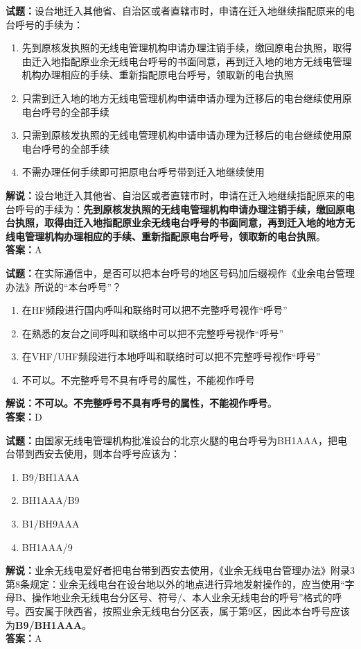 \documentclass{ctexbook}
\begin{document}
\noindent\textbf{试题：}设台地迁入其他省、自治区或者直辖市时，申请在迁入地继续指配原来的电台呼号的手续为：
\begin{enumerate}[leftmargin=3em]
\item 先到原核发执照的无线电管理机构申请办理注销手续，缴回原电台执照，取得由迁入地指配原业余无线电台呼号的书面同意，再到迁入地的地方无线电管理机构办理相应的手续、重新指配原电台呼号，领取新的电台执照
\item 只需到迁入地的地方无线电管理机构申请申请办理为迁移后的电台继续使用原电台呼号的全部手续
\item 只需到原核发执照的无线电管理机构申请申请办理为迁移后的电台继续使用原电台呼号的全部手续
\item 不需办理任何手续即可把原电台呼号带到迁入地继续使用
\end{enumerate}
\noindent\textbf{解说：}设台地迁入其他省、自治区或者直辖市时，申请在迁入地继续指配原来的电台呼号的手续为：\textbf{先到原核发执照的无线电管理机构申请办理注销手续，缴回原电台执照，取得由迁入地指配原业余无线电台呼号的书面同意，再到迁入地的地方无线电管理机构办理相应的手续、重新指配原电台呼号，领取新的电台执照}。\\\noindent\textbf{答案：}A



\bigskip


\noindent\textbf{试题：}在实际通信中，是否可以把本台呼号的地区号码加后缀视作《业余电台管理办法》所说的“本台呼号”？
\begin{enumerate}[leftmargin=3em]
\item 在HF频段进行国内呼叫和联络时可以把不完整呼号视作“呼号”
\item 在熟悉的友台之间呼叫和联络中可以把不完整呼号视作“呼号”
\item 在VHF/UHF频段进行本地呼叫和联络时可以把不完整呼号视作“呼号”
\item 不可以。不完整呼号不具有呼号的属性，不能视作呼号
\end{enumerate}
\textbf{解说：不可以。不完整呼号不具有呼号的属性，不能视作呼号}。\\\noindent\textbf{答案：}D



\bigskip


\noindent\textbf{试题：}由国家无线电管理机构批准设台的北京火腿的电台呼号为BH1AAA，把电台带到西安去使用，则本台呼号应该为：
\begin{enumerate}[leftmargin=3em]
\item B9/BH1AAA
\item BH1AAA/B9
\item B1/BH9AAA
\item BH1AAA/9
\end{enumerate}
\noindent\textbf{解说：}业余无线电爱好者把电台带到西安去使用，《业余无线电台管理办法》附录3第8条规定：业余无线电台在设台地以外的地点进行异地发射操作的，应当使用“字母B、操作地业余无线电台分区号、符号/、本人业余无线电台的呼号”格式的呼号。西安属于陕西省，按照业余无线电台分区表，属于第9区，因此本台呼号应该为\textbf{B9/BH1AAA}。\\\noindent\textbf{答案：}A
\end{document}
